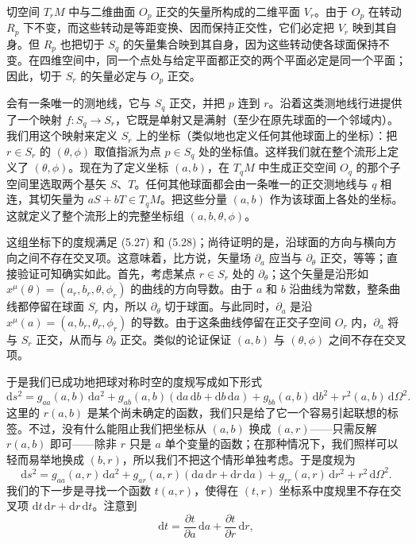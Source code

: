 切空间 $T_rM$ 中与二维曲面 $O_p$ 正交的矢量所构成的二维平面 $V_r$。由于 $O_p$ 在转动 $R_p$ 下不变，而这些转动是等距变换、因而保持正交性，它们必定把 $V_r$ 映到其自身。但 $R_p$ 也把切于 $S_q$ 的矢量集合映到其自身，因为这些转动使各球面保持不变。在四维空间中，同一个点处与给定平面都正交的两个平面必定是同一个平面；因此，切于 $S_r$ 的矢量必定与 $O_p$ 正交。

会有一条唯一的测地线，它与 $S_q$ 正交，并把 $p$ 连到 $r$。沿着这类测地线行进提供了一个映射 $f : S_q \to S_r$，它既是单射又是满射（至少在原先球面的一个邻域内）。我们用这个映射来定义 $S_r$ 上的坐标（类似地也定义任何其他球面上的坐标）：把 $r \in S_r$ 的 $(\theta, \phi)$ 取值指派为点 $p \in S_q$ 处的坐标值。这样我们就在整个流形上定义了 $(\theta, \phi)$。现在为了定义坐标 $(a, b)$，在 $T_qM$ 中生成正交空间 $O_q$ 的那个子空间里选取两个基矢 $S$、$T$。任何其他球面都会由一条唯一的正交测地线与 $q$ 相连，其切矢量为 $aS + bT \in T_qM$。把这些分量 $(a, b)$ 作为该球面上各处的坐标。这就定义了整个流形上的完整坐标组 $(a, b, \theta, \phi)$。

这组坐标下的度规满足 (5.27) 和 (5.28)；尚待证明的是，沿球面的方向与横向方向之间不存在交叉项。这意味着，比方说，矢量场 $\partial_a$ 应当与 $\partial_\theta$ 正交，等等；直接验证可知确实如此。首先，考虑某点 $r \in S_r$ 处的 $\partial_\theta$；这个矢量是沿形如 $x^\mu(\theta) = (a_r, b_r, \theta, \phi_r)$ 的曲线的方向导数。由于 $a$ 和 $b$ 沿曲线为常数，整条曲线都停留在球面 $S_r$ 内，所以 $\partial_\theta$ 切于球面。与此同时，$\partial_a$ 是沿 $x^\mu(a) = (a, b_r, \theta_r, \phi_r)$ 的导数。由于这条曲线停留在正交子空间 $O_r$ 内，$\partial_a$ 将与 $S_r$ 正交，从而与 $\partial_\theta$ 正交。类似的论证保证 $(a, b)$ 与 $(\theta, \phi)$ 之间不存在交叉项。

于是我们已成功地把球对称时空的度规写成如下形式
\begin{equation*}
\mathrm{d}s^2 = g_{aa}(a, b)\,\mathrm{d}a^2 + g_{ab}(a, b)(\mathrm{d}a\,\mathrm{d}b + \mathrm{d}b\,\mathrm{d}a) + g_{bb}(a, b)\,\mathrm{d}b^2 + r^2(a, b)\,\mathrm{d}\Omega^2.
\tag{5.29}
\end{equation*}
这里的 $r(a, b)$ 是某个尚未确定的函数，我们只是给了它一个容易引起联想的标签。不过，没有什么能阻止我们把坐标从 $(a, b)$ 换成 $(a, r)$——只需反解 $r(a, b)$ 即可——除非 $r$ 只是 $a$ 单个变量的函数；在那种情况下，我们照样可以轻而易举地换成 $(b, r)$，所以我们不把这个情形单独考虑。于是度规为
\begin{equation*}
\mathrm{d}s^2 = g_{aa}(a, r)\,\mathrm{d}a^2 + g_{ar}(a, r)(\mathrm{d}a\,\mathrm{d}r + \mathrm{d}r\,\mathrm{d}a) + g_{rr}(a, r)\,\mathrm{d}r^2 + r^2\,\mathrm{d}\Omega^2.
\tag{5.30}
\end{equation*}
我们的下一步是寻找一个函数 $t(a, r)$，使得在 $(t, r)$ 坐标系中度规里不存在交叉项 $\mathrm{d}t\,\mathrm{d}r + \mathrm{d}r\,\mathrm{d}t$。注意到
\begin{equation*}
\mathrm{d}t = \frac{\partial t}{\partial a}\,\mathrm{d}a + \frac{\partial t}{\partial r}\,\mathrm{d}r,
\tag{5.31}
\end{equation*}

